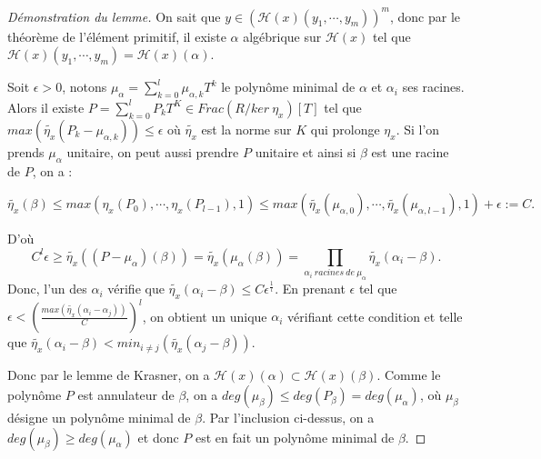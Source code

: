 \documentclass[10pt,a4paper]{amsart}
\begin{document}
\begin{proof}[Démonstration du lemme]
On sait que $y \in (\mathcal{H}(x)(y_{1}, \cdots, y_{m}))^m$, donc par le théorème de l'élément primitif, il existe $\alpha$ algébrique sur $\mathcal{H}(x)$ tel que $\mathcal{H}(x)(y_{1}, \cdots, y_{m}) = \mathcal{H}(x)(\alpha)$.

Soit $\epsilon > 0$, notons $\mu_\alpha = \sum_{k=0}^l \mu_{\alpha,k}T^k$ le polynôme minimal de $\alpha$ et $\alpha_i$ ses racines. Alors il existe $P = \sum_{k=0}^l P_k T^K \in Frac(R/ker~\eta_x)[T]$ tel que $max(\tilde{\eta_x}(P_k - \mu_{\alpha,k})) \leq \epsilon$ où $\tilde{\eta_x}$ est la norme sur $K$ qui prolonge $\eta_x$. Si l'on prends $\mu_\alpha$ unitaire, on peut aussi prendre $P$ unitaire et ainsi si $\beta$ est une racine de $P$, on a :

\begin{equation*}
\tilde{\eta_x}(\beta) \leq max(\eta_x(P_0), \cdots, \eta_x(P_{l-1}), 1) \leq  max(\tilde{\eta_x}(\mu_{\alpha,0}), \cdots, \tilde{\eta_x}(\mu_{\alpha,l-1}), 1) +\epsilon :=C.
\end{equation*}

D'où
\begin{equation*}
C^l\epsilon \geq \tilde{\eta_x}((P-\mu_{\alpha})(\beta)) = \tilde{\eta_x}(\mu_{\alpha}(\beta)) = \prod_{\alpha_i~racines~de~\mu_\alpha} \tilde{\eta_x}(\alpha_i-\beta). 
\end{equation*}
Donc, l'un des $\alpha_i$ vérifie que $\tilde{\eta_x}(\alpha_i-\beta) \leq C \epsilon^{\frac{1}{l}}$. En prenant $\epsilon$ tel que $\epsilon < (\frac{max (\tilde{\eta_x}(\alpha_i -\alpha_j))}{C})^l$, on obtient un unique $\alpha_i$ vérifiant cette condition et telle que $\tilde{\eta_x}(\alpha_i-\beta) < min_{i\neq j}(\tilde{\eta_x}(\alpha_j-\beta))$.

Donc par le lemme de Krasner, on a $\mathcal{H}(x)(\alpha) \subset \mathcal{H}(x)(\beta)$. Comme le polynôme $P$ est annulateur de $\beta$, on a $deg(\mu_\beta) \leq deg(P_\beta) = deg(\mu_\alpha)$, où $\mu_\beta$ désigne un polynôme minimal de $\beta$. Par l'inclusion ci-dessus, on a  $deg(\mu_\beta) \geq deg(\mu_\alpha)$ et donc $P$ est en fait un polynôme minimal de $\beta$. 
\end{proof}
\end{document}
